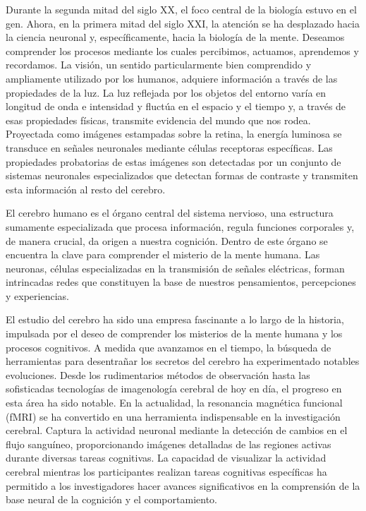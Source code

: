 \documentclass{article}
\begin{document}
	\newpage
	
	
	
	\newpage
	
	Durante la segunda mitad del siglo XX, el foco central de la biología estuvo en el gen. Ahora, en la primera mitad del siglo XXI, la atención se ha desplazado hacia la ciencia neuronal y, específicamente, hacia la biología de la mente. Deseamos comprender los procesos mediante los cuales percibimos, actuamos, aprendemos y recordamos.
	La visión, un sentido particularmente bien comprendido y ampliamente utilizado por los humanos, adquiere información a través de las propiedades de la luz. La luz reflejada por los objetos del entorno varía en longitud de onda e intensidad y fluctúa en el espacio y el tiempo y, a través de esas propiedades físicas, transmite evidencia del mundo que nos rodea. Proyectada como imágenes estampadas sobre la retina, la energía luminosa se transduce en señales neuronales mediante células receptoras específicas. Las propiedades probatorias de estas imágenes son detectadas por un conjunto de sistemas neuronales especializados que detectan formas de contraste y transmiten esta información al resto del cerebro.
	
	
	El cerebro humano es el órgano central del sistema nervioso, una estructura sumamente especializada que procesa información, regula funciones corporales y, de manera crucial, da origen a nuestra cognición. Dentro de este órgano se encuentra la clave para comprender el misterio de la mente humana. Las neuronas, células especializadas en la transmisión de señales eléctricas, forman intrincadas redes que constituyen la base de nuestros pensamientos, percepciones y experiencias.
	
	El estudio del cerebro ha sido una empresa fascinante a lo largo de la historia, impulsada por el deseo de comprender los misterios de la mente humana y los procesos cognitivos. A medida que avanzamos en el tiempo, la búsqueda de herramientas para desentrañar los secretos del cerebro ha experimentado notables evoluciones. Desde los rudimentarios métodos de observación hasta las sofisticadas tecnologías de imagenología cerebral de hoy en día, el progreso en esta área ha sido notable. En la actualidad, la resonancia magnética funcional (fMRI) se ha convertido en una herramienta indispensable en la investigación cerebral. Captura la actividad neuronal mediante la detección de cambios en el flujo sanguíneo, proporcionando imágenes detalladas de las regiones activas durante diversas tareas cognitivas. La capacidad de visualizar la actividad cerebral mientras los participantes realizan tareas cognitivas específicas ha permitido a los investigadores hacer avances significativos en la comprensión de la base neural de la cognición y el comportamiento.
	
\end{document}
